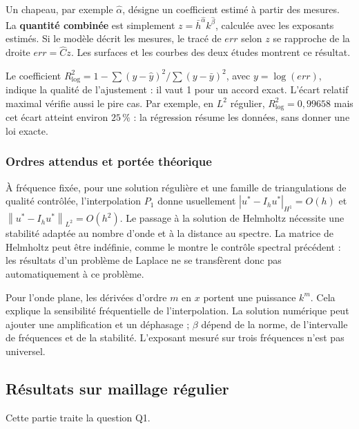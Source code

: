 \documentclass[12pt,a4paper]{article}
\newcommand{\norm}[1]{\left\lVert#1\right\rVert}
\begin{document}
Un chapeau, par exemple $\widehat\alpha$, désigne un coefficient estimé à partir des mesures. La \textbf{quantité combinée} est simplement $z=\bar h^{\widehat\alpha}k^{\widehat\beta}$, calculée avec les exposants estimés. Si le modèle décrit les mesures, le tracé de $err$ selon $z$ se rapproche de la droite $err=\widehat C z$. Les surfaces et les courbes des deux études montrent ce résultat.

Le coefficient $R^2_{\log}=1-\sum(y-\widehat y)^2/\sum(y-\bar y)^2$, avec $y=\log(err)$, indique la qualité de l'ajustement : il vaut 1 pour un accord exact. L'écart relatif maximal vérifie aussi le pire cas. Par exemple, en $L^2$ régulier, $R^2_{\log}=0,99658$ mais cet écart atteint environ $25\,\%$ : la régression résume les données, sans donner une loi exacte.

\subsubsection{Ordres attendus et portée théorique}
À fréquence fixée, pour une solution régulière et une famille de triangulations de qualité contrôlée, l'interpolation $P_1$ donne usuellement $|u^*-I_hu^*|_{H^1}=O(h)$ et $\norm{u^*-I_hu^*}_{L^2}=O(h^2)$. Le passage à la solution de Helmholtz nécessite une stabilité adaptée au nombre d'onde et à la distance au spectre. La matrice de Helmholtz peut être indéfinie, comme le montre le contrôle spectral précédent : les résultats d'un problème de Laplace ne se transfèrent donc pas automatiquement à ce problème.

Pour l'onde plane, les dérivées d'ordre $m$ en $x$ portent une puissance $k^m$. Cela explique la sensibilité fréquentielle de l'interpolation. La solution numérique peut ajouter une amplification et un déphasage ; $\beta$ dépend de la norme, de l'intervalle de fréquences et de la stabilité. L'exposant mesuré sur trois fréquences n'est pas universel.

\subsection{Résultats sur maillage régulier}
Cette partie traite la question Q1.
\end{document}
